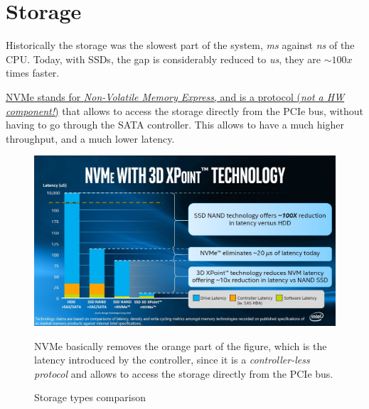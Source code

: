 \chapter{Storage}


\begin{paracol}{2}
   
   Historically the storage was the slowest part of the system, \textit{ms} against \textit{ns} of the CPU.
   Today, with SSDs, the gap is considerably reduced to \textit{us}, they are $\sim 100x$ times faster.
   
   \ul{NVMe stands for \textit{Non-Volatile Memory Express}, and is a protocol (\textit{not a HW component!})} that allows to access the storage directly from the PCIe bus, without having to go through the SATA controller. This allows to have a much higher throughput, and a much lower latency.

   \switchcolumn

   \begin{figure}[htbp]
      \centering
      \includegraphics{images/storage_intel.jpg}
      \caption{Storage types comparison}
      \label{fig:storage_intel}
      NVMe basically removes the orange part of the figure, which is the latency introduced by the controller, since it is a \textit{controller-less protocol} and allows to access the storage directly from the PCIe bus.
   \end{figure}
\end{paracol}


